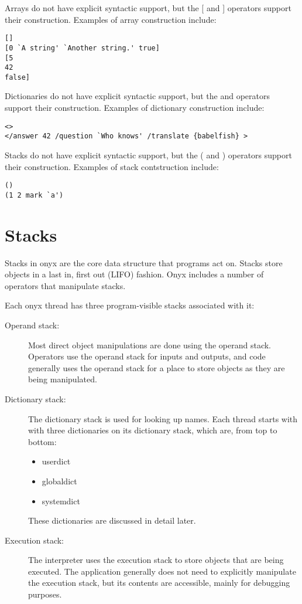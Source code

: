 Arrays do not have explicit syntactic support, but the [ and ] operators support
their construction.  Examples of array construction include:
\begin{verbatim}
[]
[0 `A string' `Another string.' true]
[5
42
false]
\end{verbatim}

Dictionaries do not have explicit syntactic support, but the {\lt} and
{\gt} operators support their construction.  Examples of dictionary
construction include:
\begin{verbatim}
<>
</answer 42 /question `Who knows' /translate {babelfish} >
\end{verbatim}

Stacks do not have explicit syntactic support, but the ( and ) operators support
their construction.  Examples of stack contstruction include:
\begin{verbatim}
()
(1 2 mark `a')
\end{verbatim}

\section{Stacks}

Stacks in onyx are the core data structure that programs act on.  Stacks store
objects in a last in, first out (LIFO) fashion.  Onyx includes a number of
operators that manipulate stacks.

Each onyx thread has three program-visible stacks associated with it:
\begin{description}
\item[Operand stack: ] Most direct object manipulations are done using the
	operand stack.  Operators use the operand stack for inputs and outputs,
	and code generally uses the operand stack for a place to store objects
	as they are being manipulated.
\item[Dictionary stack: ] The dictionary stack is used for looking up names.
	Each thread starts with with three dictionaries on its dictionary stack,
	which are, from top to bottom:
	\begin{itemize}
	\item{userdict}
	\item{globaldict}
	\item{systemdict}
	\end{itemize}
	These dictionaries are discussed in detail later.
\item[Execution stack: ] The interpreter uses the execution stack to store
	objects that are being executed.  The application generally does not
	need to explicitly manipulate the execution stack, but its contents are
	accessible, mainly for debugging purposes.
\end{description}

